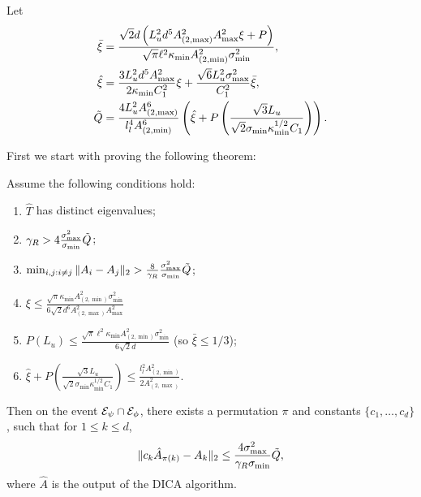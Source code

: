 Let 
\begin{align*}
\bar{\xi} &=   \frac{\sqrt{2}d\left(L_u^2d^5 A_{(2,\max)}^2A_{\max}^2\xi + P\right)}{\sqrt{\pi}\ell^2\kappa_{\min}A^2_{(2,\min)}\sigma_{\min}^2}, \\
\hat{\xi} &= \frac{3L_u^2d^5A^2_{\max}}{2\kappa_{\min}C_1^2}\xi + \frac{\sqrt{6}L_u^2\sigma_{\max}^2}{C_1^2}\bar{\xi}, \\
 \tilde{Q} &=  
 \frac{4L_u^2A^6_{(2,\max)}}{l_l^4 A^6_{(2,\min)}}\left(\hat{\xi}
 +
 P\left(\frac{\sqrt{3}L_u}{\sqrt{2}\sigma_{\min}\kappa_{\min}^{1/2}C_1}\right)\right).
\end{align*} 

First we start with proving the following theorem:
\begin{theorem}
\label{thm:Modefficiency}
 Assume the following conditions hold:
 \begin{enumerate}
 \item $\hat{T}$ has distinct eigenvalues;
 \item $\gamma_R > 4 \frac{\sigma_{\max}^2}{\sigma_{\min}}\tilde{Q}$; 
 \item $\min_{i,j:i\neq j} \|A_i - A_j\|_2 > \frac{8}{\gamma_R}\frac{\sigma_{\max}^2}{\sigma_{\min}} \tilde{Q}$;
 \item $\xi \le \frac{\sqrt{\pi}\kappa_{\min}A^2_{(2,\min)}\sigma_{\min}^2}{6\sqrt{2}d^6A_{(2,\max)}^2A_{\max}^2}$
 \item $P(L_u) \le \frac{\sqrt{\pi}\ell^2\kappa_{\min}A^2_{(2,\min)}\sigma_{\min}^2}{6\sqrt{2}d}$
 (so $\bar{\xi} \le 1/3$);
 \item $\hat{\xi}
  +
  P\left(\frac{\sqrt{3}L_u}{\sqrt{2}\sigma_{\min}\kappa_{\min}^{1/2}C_1}\right) \le \frac{l_l^2 A^2_{(2,\min)}}{2A^2_{(2,\max)}}$.
 \end{enumerate}
Then on the event $\mathcal{E}_{\psi} \cap\mathcal{E}_{\phi}$, there exists a permutation $\pi$ and constants $\{c_1,\ldots,c_d\}$, such that for $1\le k\le d$,
\[
\| c_k\hat{A}_{\pi(k)} - A_k\|_2 \le \frac{4\sigma^2_{\max}}{\gamma_R\sigma_{\min}} \tilde{Q},
\]
where $\hat{A}$ is the output of the DICA algorithm.
\end{theorem}

